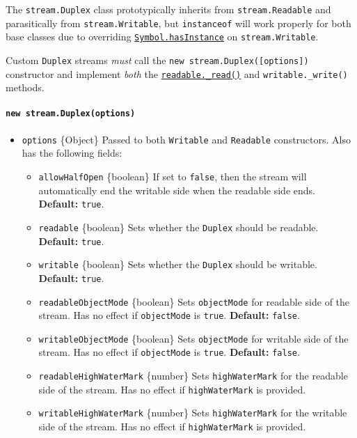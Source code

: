 The \texttt{stream.Duplex} class prototypically inherits from
\texttt{stream.Readable} and parasitically from
\texttt{stream.Writable}, but \texttt{instanceof} will work properly for
both base classes due to overriding
\href{https://developer.mozilla.org/en-US/docs/Web/JavaScript/Reference/Global_Objects/Symbol/hasInstance}{\texttt{Symbol.hasInstance}}
on \texttt{stream.Writable}.

Custom \texttt{Duplex} streams \emph{must} call the
\texttt{new\ stream.Duplex({[}options{]})} constructor and implement
\emph{both} the \hyperref[readable_readsize]{\texttt{readable.\_read()}}
and \texttt{writable.\_write()} methods.

\paragraph{\texorpdfstring{\texttt{new\ stream.Duplex(options)}}{new stream.Duplex(options)}}\label{new-stream.duplexoptions}

\begin{itemize}
\tightlist
\item
  \texttt{options} \{Object\} Passed to both \texttt{Writable} and
  \texttt{Readable} constructors. Also has the following fields:

  \begin{itemize}
  \tightlist
  \item
    \texttt{allowHalfOpen} \{boolean\} If set to \texttt{false}, then
    the stream will automatically end the writable side when the
    readable side ends. \textbf{Default:} \texttt{true}.
  \item
    \texttt{readable} \{boolean\} Sets whether the \texttt{Duplex}
    should be readable. \textbf{Default:} \texttt{true}.
  \item
    \texttt{writable} \{boolean\} Sets whether the \texttt{Duplex}
    should be writable. \textbf{Default:} \texttt{true}.
  \item
    \texttt{readableObjectMode} \{boolean\} Sets \texttt{objectMode} for
    readable side of the stream. Has no effect if \texttt{objectMode} is
    \texttt{true}. \textbf{Default:} \texttt{false}.
  \item
    \texttt{writableObjectMode} \{boolean\} Sets \texttt{objectMode} for
    writable side of the stream. Has no effect if \texttt{objectMode} is
    \texttt{true}. \textbf{Default:} \texttt{false}.
  \item
    \texttt{readableHighWaterMark} \{number\} Sets
    \texttt{highWaterMark} for the readable side of the stream. Has no
    effect if \texttt{highWaterMark} is provided.
  \item
    \texttt{writableHighWaterMark} \{number\} Sets
    \texttt{highWaterMark} for the writable side of the stream. Has no
    effect if \texttt{highWaterMark} is provided.
  \end{itemize}
\end{itemize}

